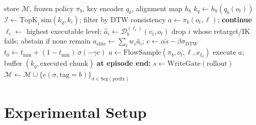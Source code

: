 \documentclass[letterpaper, 10 pt, conference]{ieeeconf}
\begin{document}
\begin{algorithm}[t]
\caption{Deployment loop for reader body $b$ (policy frozen)}
\label{alg:deploy}
\begin{algorithmic}[1]
\REQUIRE store $\mathcal{M}$, frozen policy $\pi_b$, key encoder $q_b$,
         alignment map $h_b$
  \STATE $k_q \leftarrow h_b(q_b(o_t))$
  \STATE $\mathcal{I} \leftarrow \mathrm{TopK}_i\,\mathrm{sim}(k_q,k_i)$;
         filter by DTW consistency \hfill{}
    \STATE $a \leftarrow \pi_b(o_t,\ell)$; \textbf{continue}
           \hfill{}
  \ENDIF
  \STATE $\ell_i \leftarrow$ highest executable level;
         $\hat a_i \leftarrow \mathcal{D}_b^{(\ell_i)}(v_i,o_t)$
  \STATE drop $i$ whose retarget/IK fails; abstain if none remain
  \STATE $a_\mathrm{elite}\leftarrow\sum_i w_i \hat a_i$;
         $c \leftarrow \alpha\tilde{s}-\beta\sigma_\mathrm{DTW}$
  \STATE $t_0 \leftarrow t_{\min}+(1-t_{\min})\,\sigma(-\gamma c)$
  \STATE $a \leftarrow \mathrm{FlowSample}(\pi_b,o_t,\ell,x_{t_0})$
  \STATE execute $a$; buffer $(k_q,\text{executed chunk})$
\ENDFOR
\STATE \textbf{at episode end:} $s\leftarrow\mathrm{WriteGate}(\text{rollout})$
  \STATE $\mathcal{M}\leftarrow\mathcal{M}\cup
         \{e(\sigma,\text{tag}=b)\}_{\sigma\in\mathrm{Seg}(\text{prefix})}$
\ENDIF
\end{algorithmic}
\end{algorithm}


\section{Experimental Setup}
\label{sec:setup}
\end{document}
